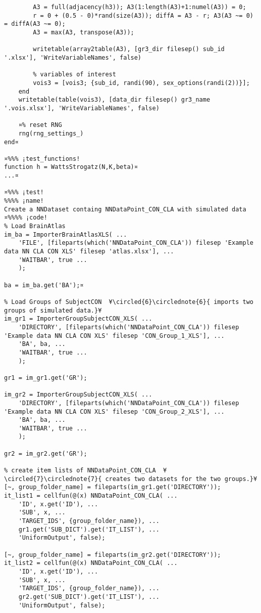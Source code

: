 \documentclass{tufte-handout}
\begin{document}
\begin{lstlisting}
        A3 = full(adjacency(h3)); A3(1:length(A3)+1:numel(A3)) = 0;
        r = 0 + (0.5 - 0)*rand(size(A3)); diffA = A3 - r; A3(A3 ~= 0) = diffA(A3 ~= 0);
        A3 = max(A3, transpose(A3));

        writetable(array2table(A3), [gr3_dir filesep() sub_id '.xlsx'], 'WriteVariableNames', false)

        % variables of interest
        vois3 = [vois3; {sub_id, randi(90), sex_options(randi(2))}];
    end
    writetable(table(vois3), [data_dir filesep() gr3_name '.vois.xlsx'], 'WriteVariableNames', false)

    ¤% reset RNG
    rng(rng_settings_)
end¤

¤%%% ¡test_functions!
function h = WattsStrogatz(N,K,beta)¤
...¤

¤%%% ¡test! 
%%%% ¡name!
Create a NNDataset containg NNDataPoint_CON_CLA with simulated data
¤%%%% ¡code!
% Load BrainAtlas
im_ba = ImporterBrainAtlasXLS( ...
    'FILE', [fileparts(which('NNDataPoint_CON_CLA')) filesep 'Example data NN CLA CON XLS' filesep 'atlas.xlsx'], ...
    'WAITBAR', true ...
    );

ba = im_ba.get('BA');¤

% Load Groups of SubjectCON  ¥\circled{6}\circlednote{6}{ imports two groups of simulated data.}¥
im_gr1 = ImporterGroupSubjectCON_XLS( ...
    'DIRECTORY', [fileparts(which('NNDataPoint_CON_CLA')) filesep 'Example data NN CLA CON XLS' filesep 'CON_Group_1_XLS'], ...
    'BA', ba, ...
    'WAITBAR', true ...
    );

gr1 = im_gr1.get('GR');

im_gr2 = ImporterGroupSubjectCON_XLS( ...
    'DIRECTORY', [fileparts(which('NNDataPoint_CON_CLA')) filesep 'Example data NN CLA CON XLS' filesep 'CON_Group_2_XLS'], ...
    'BA', ba, ...
    'WAITBAR', true ...
    );

gr2 = im_gr2.get('GR');

% create item lists of NNDataPoint_CON_CLA  ¥\circled{7}\circlednote{7}{ creates two datasets for the two groups.}¥
[~, group_folder_name] = fileparts(im_gr1.get('DIRECTORY'));
it_list1 = cellfun(@(x) NNDataPoint_CON_CLA( ...
    'ID', x.get('ID'), ...
    'SUB', x, ...
    'TARGET_IDS', {group_folder_name}), ...
    gr1.get('SUB_DICT').get('IT_LIST'), ...
    'UniformOutput', false);

[~, group_folder_name] = fileparts(im_gr2.get('DIRECTORY'));
it_list2 = cellfun(@(x) NNDataPoint_CON_CLA( ...
    'ID', x.get('ID'), ...
    'SUB', x, ...
    'TARGET_IDS', {group_folder_name}), ...
    gr2.get('SUB_DICT').get('IT_LIST'), ...
    'UniformOutput', false);


\end{lstlisting}
\end{document}
